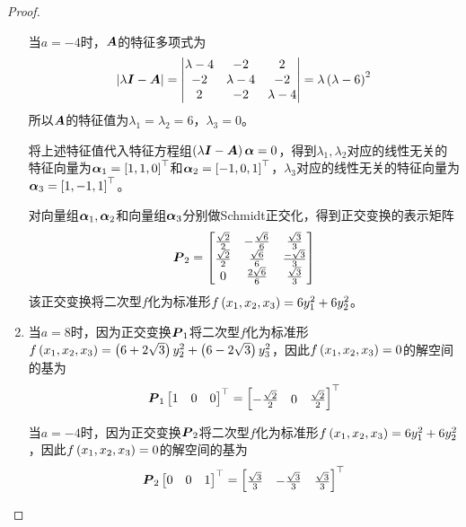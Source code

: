 \begin{proof}
\begin{enumerate}
{              当\(a=-4\)时，\(\boldsymbol{A}\)的特征多项式为
              \begin{equation*}
                  \left|\lambda\boldsymbol{I}-\boldsymbol{A} \right|=\begin{vmatrix}\lambda-4&-2&2\\-2&\lambda-4&-2\\2&-2&\lambda-4\end{vmatrix}=\lambda\left( \lambda-6 \right)^2
              \end{equation*}
              所以\(\boldsymbol{A}\)的特征值为\(\lambda_1=\lambda_2=6\)，\(\lambda_3=0\)。

              将上述特征值代入特征方程组\(\left( \lambda\boldsymbol{I}-\boldsymbol{A} \right)\boldsymbol{\alpha}=0\)，得到\(\lambda_1,\lambda_2\)对应的线性无关的特征向量为\(\boldsymbol{\alpha}_1=\left[ 1,1,0 \right]^\top\)和\(\boldsymbol{\alpha}_2=\left[ -1,0,1 \right]^\top\)，\(\lambda_3\)对应的线性无关的特征向量为\(\boldsymbol{\alpha}_3=\left[ 1,-1,1 \right]^\top\)。

              对向量组\(\boldsymbol{\alpha}_1,\boldsymbol{\alpha}_2\)和向量组\(\boldsymbol{\alpha}_3\)分别做Schmidt正交化，得到正交变换的表示矩阵
              \begin{equation*}
                  \boldsymbol{P}_2=
                  \begin{bmatrix}
                      \frac{\sqrt{2}}{2} & -\frac{\sqrt{6}}{6} & \frac{\sqrt{3}}{3}  \\
                      \frac{\sqrt{2}}{2} & \frac{\sqrt{6}}{6}  & \frac{-\sqrt{3}}{3} \\
                      0                  & \frac{2\sqrt{6}}{6} & \frac{\sqrt{3}}{3}
                  \end{bmatrix}
              \end{equation*}
              该正交变换将二次型\(f\)化为标准形\(f\left( x_1,x_2,x_3 \right)=6y_1^2+6y_2^2\)。
              }
        \item {
              当\(a=8\)时，因为正交变换\(\boldsymbol{P}_1\)将二次型\(f\)化为标准形\(f\left( x_1,x_2,x_3 \right)=\left( 6+2\sqrt{3} \right)y_2^2+\left( 6-2\sqrt{3} \right)y_3^2\)，因此\(f\left( x_1,x_2,x_3 \right)=0\)的解空间的基为
              \begin{equation*}
                  \boldsymbol{P}_1\begin{bmatrix}1&0&0\end{bmatrix}^\top=\begin{bmatrix}-\frac{\sqrt{2}}{2}&0&\frac{\sqrt{2}}{2}\end{bmatrix}^\top
              \end{equation*}

              当\(a=-4\)时，因为正交变换\(\boldsymbol{P}_2\)将二次型\(f\)化为标准形\(f\left( x_1,x_2,x_3 \right)=6y_1^2+6y_2^2\)，因此\(f\left( x_1,x_2,x_3 \right)=0\)的解空间的基为
              \begin{equation*}
                  \boldsymbol{P}_2\begin{bmatrix}0&0&1\end{bmatrix}^\top=\begin{bmatrix}\frac{\sqrt{3}}{3}&-\frac{\sqrt{3}}{3}&\frac{\sqrt{3}}{3}\end{bmatrix}^\top
              \end{equation*}
              }
    \end{enumerate}
\end{proof}

